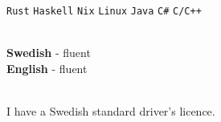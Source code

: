 \documentclass[9pt]{developercv}
\begin{document}
\begin{minipage}[t]{0.4\textwidth}
	\vspace{-\baselineskip}
		{
			\texttt{Rust}\slashsep
			\texttt{Haskell}\slashsep
			\texttt{Nix}\slashsep
			\texttt{Linux}\slashsep
			\texttt{Java}\slashsep
			\texttt{C\#}\slashsep
			\texttt{C/C++}
		}
\end{minipage}
\hfill
\begin{minipage}[t]{0.2\textwidth}
	\vspace{-\baselineskip}
	\\
	\textbf{Swedish} - fluent\\
	\textbf{English} - fluent
\end{minipage}
\hfill
\begin{minipage}[t]{0.3\textwidth}
	\vspace{-\baselineskip}
	\\I have a Swedish standard driver's licence.
\end{minipage}
\end{document}
